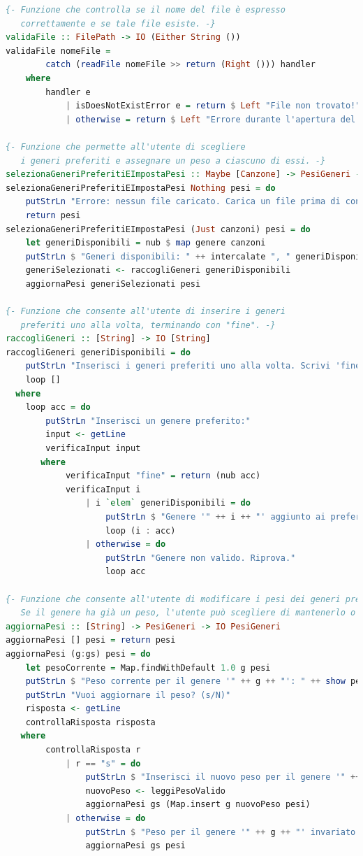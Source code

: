 \documentclass[a4paper,11pt]{article}
\begin{document}
\begin{lstlisting}[language=Haskell]
{- Funzione che controlla se il nome del file è espresso
   correttamente e se tale file esiste. -}
validaFile :: FilePath -> IO (Either String ())
validaFile nomeFile =
        catch (readFile nomeFile >> return (Right ())) handler
    where
        handler e
            | isDoesNotExistError e = return $ Left "File non trovato!"
            | otherwise = return $ Left "Errore durante l'apertura del file."

{- Funzione che permette all'utente di scegliere
   i generi preferiti e assegnare un peso a ciascuno di essi. -}
selezionaGeneriPreferitiEImpostaPesi :: Maybe [Canzone] -> PesiGeneri -> IO PesiGeneri
selezionaGeneriPreferitiEImpostaPesi Nothing pesi = do
    putStrLn "Errore: nessun file caricato. Carica un file prima di continuare."
    return pesi
selezionaGeneriPreferitiEImpostaPesi (Just canzoni) pesi = do
    let generiDisponibili = nub $ map genere canzoni
    putStrLn $ "Generi disponibili: " ++ intercalate ", " generiDisponibili
    generiSelezionati <- raccogliGeneri generiDisponibili
    aggiornaPesi generiSelezionati pesi

{- Funzione che consente all'utente di inserire i generi
   preferiti uno alla volta, terminando con "fine". -}
raccogliGeneri :: [String] -> IO [String]
raccogliGeneri generiDisponibili = do
    putStrLn "Inserisci i generi preferiti uno alla volta. Scrivi 'fine' per terminare."
    loop []
  where
    loop acc = do
        putStrLn "Inserisci un genere preferito:"
        input <- getLine
        verificaInput input
       where
            verificaInput "fine" = return (nub acc)
            verificaInput i
                | i `elem` generiDisponibili = do
                    putStrLn $ "Genere '" ++ i ++ "' aggiunto ai preferiti."
                    loop (i : acc)
                | otherwise = do
                    putStrLn "Genere non valido. Riprova."
                    loop acc

{- Funzione che consente all'utente di modificare i pesi dei generi preferiti.
   Se il genere ha già un peso, l'utente può scegliere di mantenerlo o aggiornarlo. -}
aggiornaPesi :: [String] -> PesiGeneri -> IO PesiGeneri
aggiornaPesi [] pesi = return pesi
aggiornaPesi (g:gs) pesi = do
    let pesoCorrente = Map.findWithDefault 1.0 g pesi
    putStrLn $ "Peso corrente per il genere '" ++ g ++ "': " ++ show pesoCorrente
    putStrLn "Vuoi aggiornare il peso? (s/N)"
    risposta <- getLine
    controllaRisposta risposta
   where
        controllaRisposta r
            | r == "s" = do
                putStrLn $ "Inserisci il nuovo peso per il genere '" ++ g ++ "':"
                nuovoPeso <- leggiPesoValido
                aggiornaPesi gs (Map.insert g nuovoPeso pesi)
            | otherwise = do
                putStrLn $ "Peso per il genere '" ++ g ++ "' invariato."
                aggiornaPesi gs pesi


\end{lstlisting}
\end{document}
